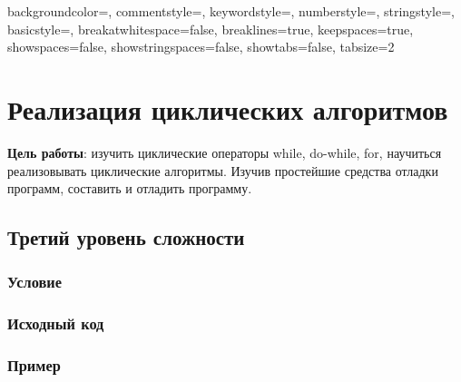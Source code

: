 
\usepackage{listings}
\usepackage{xcolor}


 {
    backgroundcolor=\color{backcolour}, commentstyle=\color{codegreen},
    keywordstyle=\color{codeblue},
    numberstyle=\tiny\color{codegray},
    stringstyle=\color{codeblue},
    basicstyle=\ttfamily\footnotesize,
    breakatwhitespace=false,         
    breaklines=true,                   
    keepspaces=true,             
    showspaces=false,                
    showstringspaces=false,
    showtabs=false,                  
    tabsize=2
}

\lstset{style=mystyle}





\section{Реализация циклических алгоритмов}

\textbf{Цель работы}: изучить циклические операторы while, do-while, for,
научиться реализовывать циклические алгоритмы. Изучив простейшие средства
отладки программ, составить и отладить программу.

\subsection{Третий уровень сложности}

\subsubsection{Условие}



\subsubsection{Исходный код}


\subsubsection{Пример}



